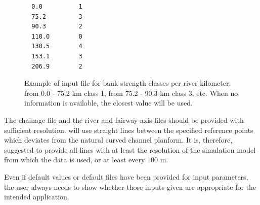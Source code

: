 \begin{figure}[!hb]

\begin{Verbatim}
  0.0          1
  75.2         3
  90.3         2
  110.0        0
  130.5        4
  153.1        3
  206.9        2
\end{Verbatim}
\caption{Example of input file for bank strength classes per river kilometer: from 0.0 - 75.2 km class 1, from 75.2 - 90.3 km class 3, etc.
When no information is available, the closest value will be used.}
\label{Fig2.3}
\end{figure}

\clearpage
\Note The chainage file and the river and fairway axis files should be provided with sufficient resolution.
\dfastbe will use straight lines between the specified reference points which deviates from the natural curved channel planform.
It is, therefore, suggested to provide all lines with at least the resolution of the simulation model from which the data is used, or at least every 100 m.

\Note Even if default values or default files have been provided for input parameters, the user always needs to show whether those inputs given are appropriate for the intended application.

